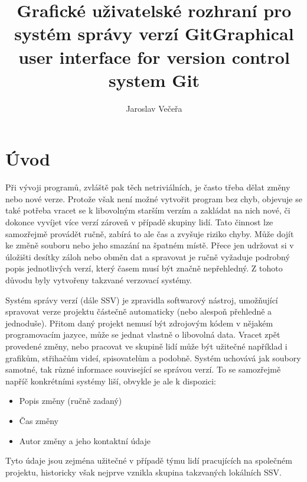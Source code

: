 \documentclass[
  biblatex,
  glossaries,
  index
]{kidiplom}
\title{Grafické uživatelské rozhraní pro systém správy verzí Git}
\title[english]{Graphical user interface for version control system Git}
\author{Jaroslav Večeřa}
\begin{document}
\maketitle



\newcommand{\BibLaTeX}{\textsc{Bib}\LaTeX}

\section{Úvod}
Při vývoji programů, zvláště pak těch netriviálních, je často třeba
dělat změny nebo nové verze. Protože však není možné vytvořit program
bez chyb, objevuje se také potřeba vracet se k libovolným starším
verzím a zakládat na nich nové, či dokonce vyvíjet více verzí zároveň v
případě skupiny lidí. Tato činnost lze samozřejmě provádět ručně,
zabírá to ale čas a zvyšuje riziko chyby. Může dojít ke změně souboru
nebo jeho smazání na špatném místě. Přece jen udržovat si v úložišti
desítky záloh nebo obměn dat a spravovat je ručně vyžaduje podrobný
popis jednotlivých verzí, který časem musí být značně nepřehledný.
Z tohoto důvodu byly vytvořeny takzvané verzovací systémy.

Systém správy verzí (dále SSV) je zpravidla softwarový nástroj,
umožňující spravovat verze projektu částečně automaticky (nebo alespoň
přehledně a jednoduše). Přitom daný projekt nemusí být zdrojovým kódem
v nějakém programovacím jazyce, může se jednat vlastně o libovolná data.
Vracet zpět provedené změny, nebo pracovat ve skupině lidí může být
užitečné například i grafikům, střihačům videí, spisovatelům a podobně.
Systém uchovává jak soubory samotné, tak různé informace související
se správou verzí. To se samozřejmě napříč konkrétními systémy liší,
obvykle je ale k dispozici:
\begin{itemize}
\item Popis změny (ručně zadaný)
\item Čas změny
\item Autor změny a jeho kontaktní údaje
\end{itemize}

Tyto údaje jsou zejména užitečné v případě týmu lidí pracujících na
společném projektu, historicky však nejprve vznikla skupina takzvaných
lokálních SSV.
\end{document}
